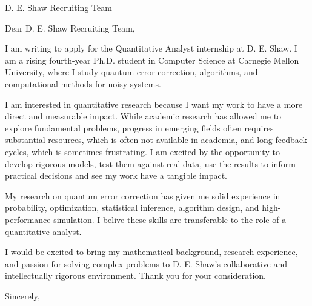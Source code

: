 \documentclass[11pt]{letter}
\begin{document}
\begin{letter}{D. E. Shaw Recruiting Team}

  \opening{Dear D. E. Shaw Recruiting Team,}

  I am writing to apply for the Quantitative Analyst internship at
  D. E. Shaw. I am a rising fourth-year Ph.D. student in Computer
  Science at Carnegie Mellon University, where I study quantum error
  correction, algorithms, and computational methods for noisy systems.

  I am interested in quantitative research because I want my work to have
  a more direct and measurable impact. While academic research has
  allowed me to explore fundamental problems, progress in emerging
  fields often requires substantial resources, which is often not
  available in academia, and long feedback
  cycles, which is sometimes frustrating. I am excited by the
  opportunity to develop rigorous models,
  test them against real data, use the results to inform
  practical decisions and see my work have a tangible impact.

  My research on quantum error correction has given me solid
  experience in probability,
  optimization, statistical inference, algorithm design, and
  high-performance simulation. I belive these skills are transferable
  to the role of a quantitative analyst.

  I would be excited to bring my mathematical background, research
  experience, and passion for solving complex problems to D. E.
  Shaw's collaborative
  and intellectually rigorous environment. Thank you for your consideration.

  \closing{Sincerely,}

\end{letter}
\end{document}
